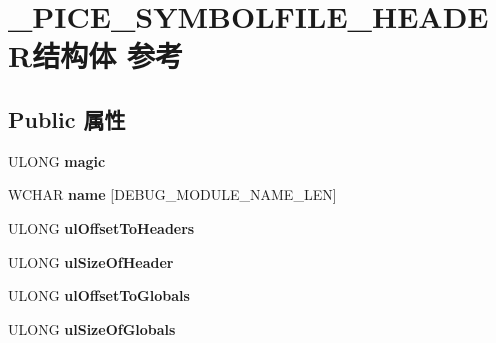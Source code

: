 \hypertarget{struct___p_i_c_e___s_y_m_b_o_l_f_i_l_e___h_e_a_d_e_r}{}\section{\+\_\+\+P\+I\+C\+E\+\_\+\+S\+Y\+M\+B\+O\+L\+F\+I\+L\+E\+\_\+\+H\+E\+A\+D\+E\+R结构体 参考}
\label{struct___p_i_c_e___s_y_m_b_o_l_f_i_l_e___h_e_a_d_e_r}
\subsection*{Public 属性}
\begin{DoxyCompactItemize}
\item 
\mbox{\label{struct___p_i_c_e___s_y_m_b_o_l_f_i_l_e___h_e_a_d_e_r_a96dffe55c7ebc104e29f63cc4ae09d84}} 
U\+L\+O\+NG {\bfseries magic}
\item 
\mbox{\label{struct___p_i_c_e___s_y_m_b_o_l_f_i_l_e___h_e_a_d_e_r_a3031740ef9fa7a48b6d4d9a6b64e6d6e}} 
W\+C\+H\+AR {\bfseries name} \mbox{[}D\+E\+B\+U\+G\+\_\+\+M\+O\+D\+U\+L\+E\+\_\+\+N\+A\+M\+E\+\_\+\+L\+EN\mbox{]}
\item 
\mbox{\label{struct___p_i_c_e___s_y_m_b_o_l_f_i_l_e___h_e_a_d_e_r_a6c2b02d654a90a6d90d3d1ba2b11b5b4}} 
U\+L\+O\+NG {\bfseries ul\+Offset\+To\+Headers}
\item 
\mbox{\label{struct___p_i_c_e___s_y_m_b_o_l_f_i_l_e___h_e_a_d_e_r_a7a10a0acb0b352fbd51a6045121e20e4}} 
U\+L\+O\+NG {\bfseries ul\+Size\+Of\+Header}
\item 
\mbox{\label{struct___p_i_c_e___s_y_m_b_o_l_f_i_l_e___h_e_a_d_e_r_a11fecb4d2197c811ef20f47e67f3298b}} 
U\+L\+O\+NG {\bfseries ul\+Offset\+To\+Globals}
\item 
\mbox{\label{struct___p_i_c_e___s_y_m_b_o_l_f_i_l_e___h_e_a_d_e_r_a4900b65aacf227acae2c97094cadb0cf}} 
U\+L\+O\+NG {\bfseries ul\+Size\+Of\+Globals}

\end{DoxyCompactItemize}
